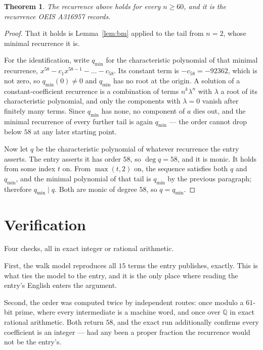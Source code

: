 \documentclass[11pt,a4paper]{article}
\theoremstyle{plain}
\newtheorem{theorem}{Theorem}
\theoremstyle{definition}
\begin{document}
\begin{theorem}
The recurrence above holds for every $n\ge60$, and it is the recurrence OEIS A316957 records.
\end{theorem}

\begin{proof}
That it holds is Lemma~\ref{lem:bm} applied to the tail from $n=2$, whose minimal
recurrence it is.

For the identification, write $q_{\min}$ for the characteristic polynomial of that minimal
recurrence, $x^{58}-c_1x^{58-1}-\dots-c_{58}$. Its constant term is
$-c_{58}=-92362$, which is not zero, so $q_{\min}(0)\neq0$ and $q_{\min}$ has no
root at the origin. A solution of a constant-coefficient recurrence is a combination of terms
$n^{k}\lambda^{n}$ with $\lambda$ a root of its characteristic polynomial, and only the
components with $\lambda=0$ vanish after finitely many terms. Since $q_{\min}$ has none, no
component of $a$ dies out, and the minimal recurrence of every further tail is again
$q_{\min}$ --- the order cannot drop below $58$ at any later starting point.

Now let $q$ be the characteristic polynomial of whatever recurrence the entry asserts. The
entry asserts it has order $58$, so $\deg q=58$, and it is monic. It holds from some
index $t$ on. From $\max(t,2)$ on, the sequence satisfies both $q$ and $q_{\min}$, and
the minimal polynomial of that tail is $q_{\min}$ by the previous paragraph; therefore
$q_{\min}\mid q$. Both are monic of degree $58$, so $q=q_{\min}$.
\end{proof}

\section{Verification}

Four checks, all in exact integer or rational arithmetic.

First, the walk model reproduces all $15$ terms the entry publishes, exactly. This is
what ties the model to the entry, and it is the only place where reading the entry's English
enters the argument.

Second, the order was computed twice by independent routes: once modulo a $61$-bit prime, where
every intermediate is a machine word, and once over $\mathbb{Q}$ in exact rational arithmetic.
Both return $58$, and the exact run additionally confirms every coefficient is an integer
--- had any been a proper fraction the recurrence would not be the entry's.
\end{document}
